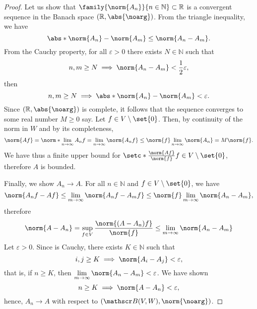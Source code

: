 \begin{proof}
    Let us show that \(\family{\norm{A_n}}{n\in \mathbb{N}} \subset \mathbb{R}\) is a convergent sequence in the Banach space \((\mathbb{R}, \abs{\noarg})\). From the triangle inequality, we have
    \begin{equation*}
        \abs*{\norm{A_n} - \norm{A_m}} \leq \norm{A_n - A_m}.
    \end{equation*}
    From the Cauchy property, for all \(\varepsilon > 0\) there exists \(N \in \mathbb{N}\) such that
    \begin{equation*}
        n, m \geq N \implies \norm{A_n - A_m} < \frac12\varepsilon,
    \end{equation*}
    then
    \begin{equation*}
        n, m \geq N \implies \abs*{\norm{A_n} - \norm{A_m}} < \varepsilon.
    \end{equation*}
    Since \((\mathbb{R}, \abs{\noarg})\) is complete, it follows that the sequence converges to some real number \(M \geq 0\) say. Let \(f \in V \setminus\set{0}\). Then, by continuity of the norm in \(W\) and by its completeness,
    \begin{equation*}
        \norm{Af} = \norm*{\lim_{n\to \infty} A_n f} = \lim_{n\to \infty} \norm{A_nf} \leq \norm{f} \lim_{n\to \infty} \norm{A_n} = M \norm{f}.
    \end{equation*}
    We have thus a finite upper bound for \(\setc*{\frac{\norm{Af}}{\norm{f}}}{f \in V\setminus\set{0}}\), therefore \(A\) is bounded.

    Finally, we show \(A_n \to A\). For all \(n \in \mathbb{N}\) and \(f \in V\setminus\set{0}\), we have
    \begin{equation*}
        \norm{A_n f - Af} \leq \lim_{m \to \infty} \norm{A_n f - A_m f} \leq \norm{f} \lim_{m \to \infty} \norm{A_n - A_m},
    \end{equation*}
    therefore
    \begin{equation*}
        \norm{A - A_n} = \sup_{f \in V} \frac{\norm{(A - A_n)f}}{\norm{f}} \leq \lim_{m\to \infty} \norm{A_n - A_m}
    \end{equation*}
    Let \(\varepsilon > 0\). Since  is Cauchy, there exists \(K \in \mathbb{N}\) such that
    \begin{equation*}
        i, j \geq K \implies \norm{A_i - A_j} < \varepsilon,
    \end{equation*}
    that is, if \(n \geq K\), then \(\displaystyle\lim_{m\to \infty}\norm{A_n - A_m} < \varepsilon\). We have shown
    \begin{equation*}
        n \geq K \implies \norm{A - A_n} < \varepsilon,
    \end{equation*}
    hence, \(A_n \to A\) with respect to \((\bounded(V, W), \norm{\noarg})\).
\end{proof}
